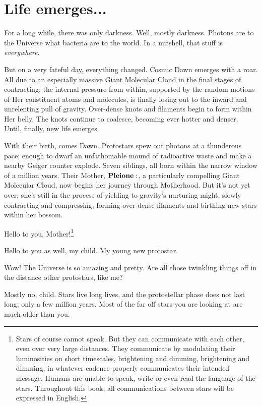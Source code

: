 \documentclass[main.tex]{subfiles}
\begin{document}
\section{Life emerges...}

For a long while, there was only darkness.  Well, mostly darkness.  Photons are to the Universe what bacteria are to the world.  In a nutshell, that stuff is \textit{everywhere}.  

But on a very fateful day, everything changed.  Cosmic Dawn emerges with a roar.  All due to an especially massive Giant Molecular Cloud in the final stages of contracting; the internal pressure from within, supported by the random motions of Her constituent atoms and molecules, is finally losing out to the inward and unrelenting pull of gravity.  Over-dense knots and filaments begin to form within Her belly.  The knots continue to coalesce, becoming ever hotter and denser. Until, finally, new life emerges.  

With their birth, comes Dawn.  Protostars spew out photons at a thunderous pace; enough to dwarf an unfathomable mound of radioactive waste and make a nearby Geiger counter explode.  Seven siblings, all born within the narrow window of a million years. Their Mother, $\Pleione$, a particularly compelling Giant Molecular Cloud, now begins her journey through Motherhood.  But it's not yet over; she's still in the process of yielding to gravity's nurturing might, slowly contracting and compressing, forming over-dense filaments and birthing new stars within her bossom.  

\Maia Hello to you, Mother!\footnote{Stars of course cannot speak.  But they can communicate with each other, even over very large distances.  They communicate by modulating their luminosities on short timescales, brightening and dimming, brightening and dimming, in whatever cadence properly communicates their intended message.  Humans are unable to speak, write or even read the language of the stars.  Throughout this book, all communications between stars will be expressed in English.} 

\Pleione Hello to you as well, my child.  My young new protostar.

\Maia Wow!  The Universe is so amazing and pretty.  Are all those twinkling things off in the distance other protostars, like me?

\Pleione Mostly no, child.  Stars live long lives, and the protostellar phase does not last long; only a few million years.  Most of the far off stars you are looking at are much older than you.
\end{document}
